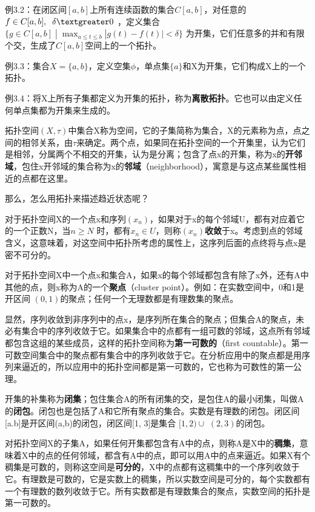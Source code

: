 \noindent
例3.2：在闭区间$ [a,b] $上所有连续函数的集合$ C[a,b] $，对任意的 $ f\in C[a,b],\;\;\delta \textgreater 0 $ 
，定义集合 $ \{ g \in C[a,b]\; |\; \max_{a\leq t \leq b} |g(t)-f(t)|<\delta\} $ 为开集，它们任意多的并和有限个交，生成了$ C[a,b] $空间上的一个拓扑。

\noindent
例3.3：集合$ X=\{a,b\} $，定义空集$\phi$，单点集$ \{a\} $和X为开集，它们构成X上的一个拓扑。

\noindent
例3.4：将X上所有子集都定义为开集的拓扑，称为\textbf{离散拓扑}。它也可以由定义任何单点集都为开集来生成的。

\songti
\setlength{\leftskip}{0em}

拓扑空间$ (X,\tau) $中集合X称为空间，它的子集简称为集合，X的元素称为点，点之间的相邻关系，由$\tau$来确定。两个点，如果同在拓扑空间的一个开集里，认为它们是相邻，分属两个不相交的开集，认为是分离；包含了点x的开集，称为x的\textbf{开邻域}，包住x开邻域的集合称为x的\textbf{邻域}（neighborhood），寓意是与这点某些属性相近的点都在这里。

那么，怎么用拓扑来描述趋近状态呢？

对于拓扑空间X的一个点x和序列$ (x_n) $，如果对于x的每个邻域U，都有对应着它的一个正数N，当$ n \ge N  $ 时，都有$ x_n \in  U $，则称$ (x_n) $\textbf{收敛}于x。考虑到点的邻域含义，这意味着，对这空间中拓扑所考虑的属性上，这序列后面的点终将与点x是密不可分的。

对于拓扑空间X中一个点x和集合A，如果x的每个邻域都包含有除了x外，还有A中其他的点，则x称为A的一个\textbf{聚点}（cluster point）。例如：在实数空间中，0和1是开区间 $ (0, 1) $的聚点；任何一个无理数都是有理数集的聚点。

显然，序列收敛到非序列中的点x，是序列所在集合的聚点；但集合A的聚点，未必有集合中的序列收敛于它。如果集合中的点都有一组可数的邻域，这点所有邻域都包含这组的某些成员，这样的拓扑空间称为\textbf{第一可数的}（first countable）。第一可数空间集合中的聚点都有集合中的序列收敛于它。在分析应用中的聚点都是用序列来逼近的，所以应用中的拓扑空间都是第一可数的，它也称为可数性的第一公理。

开集的补集称为\textbf{闭集}；包住集合A的所有闭集的交，是包住A的最小闭集，叫做A的\textbf{闭包}。闭包也是包括了A和它所有聚点的集合。实数是有理数的闭包。闭区间[a.b]是开区间(a,b)的闭包，闭区间[1, 3]是集合 $[1, 2)\cup $  $(2, 3) $的闭包。

对拓扑空间X的子集A，如果任何开集都包含有A中的点，则称A是X中的\textbf{稠集}，意味着X中的点的任何邻域，都含有A中的点，即可以用A中的点来逼近。如果X有个稠集是可数的，则称这空间是\textbf{可分的}，X中的点都有这稠集中的一个序列收敛于它。有理数是可数的，它是实数上的稠集，所以实数空间是可分的，每个实数都有一个有理数的数列收敛于它。所有实数都是有理数集合的聚点，实数空间的拓扑是第一可数的。

